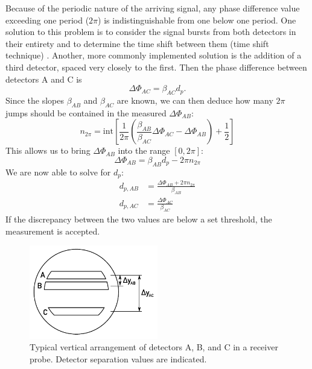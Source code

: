\documentclass[11.5pt]{book}
\begin{document}
Because of the periodic nature of the arriving signal, any phase difference value
exceeding one period ($2\pi$) is indistinguishable from one below one period.
One solution to this problem is to consider the signal bursts from both
detectors in their entirety and to determine the time shift between them (time
shift technique) \cite{Albrecht03}. Another, more commonly implemented solution
is the addition of a third detector, spaced very closely to the first. Then the
phase difference between detectors A and C is
\begin{equation}
    \Delta \Phi_{AC} = \beta_{AC} d_p.
\end{equation}
Since the slopes $\beta_{AB}$ and $\beta_{AC}$ are known, we can then deduce how
many $2\pi$ jumps should be contained in the measured $\Delta \Phi_{AB}$:
\begin{equation}
    n_{2\pi} = \mathrm{int}\left[
        \frac{1}{2\pi}\left(\frac{\beta_{AB}}{\beta_{AC}} \Delta \Phi_{AC} -
    \Delta\Phi_{AB} \right) + \frac{1}{2}\right]
\end{equation}
This allows us to bring $\Delta\Phi_{AB}$ into the range $[0, 2\pi]$:
\begin{equation}
    \Delta\Phi_{AB} = \beta_{AB} d_p - 2\pi n_{2\pi}
\end{equation}
We are now able to solve for $d_p$:
\begin{align}
    d_{p,AB} &= \frac{\Delta\Phi_{AB} + 2\pi n_{2\pi}}{\beta_{AB}}\\
    d_{p,AC} &= \frac{\Delta\Phi_{AC}}{\beta_{AC}}
\end{align}
If the discrepancy between the two values are below a set threshold, the
measurement is accepted.

\begin{figure}
    \centering
    \includegraphics[width=0.5\textwidth]{img/setup/detector_arrangement.pdf}
    \caption{Typical vertical arrangement of detectors A, B, and C in a receiver
        probe. Detector separation values are indicated. \label{fig:pdpa-detector-arrangement}}
\end{figure}
\end{document}
